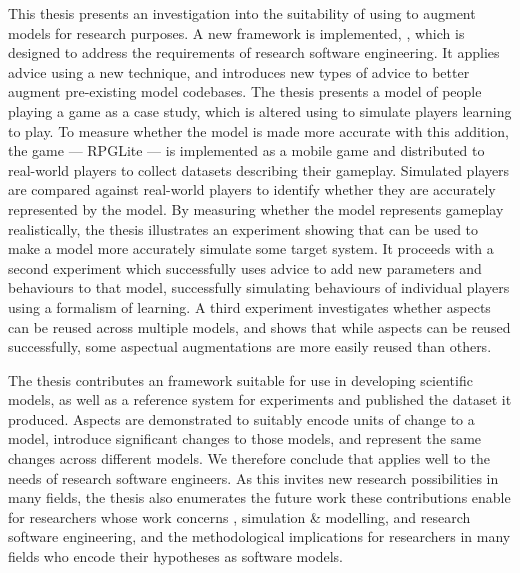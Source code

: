     This thesis presents an investigation into the suitability of using \aop{}
    to augment models for research purposes. A new \aspectorientation{}
    framework is implemented, \pdsf{}, which is designed to address the
    requirements of research software engineering. It applies advice using a new
    technique, and introduces new types of advice to better augment pre-existing
    model codebases. The thesis presents a model of people playing a game as a
    case study, which is altered using \pdsf{} to simulate players learning to
    play. To measure whether the model is made more accurate with this addition,
    the game --- RPGLite --- is implemented as a mobile game and distributed to
    real-world players to collect datasets describing their gameplay. Simulated
    players are compared against real-world players to identify whether they are
    accurately represented by the model. By measuring whether the model
    represents gameplay realistically, the thesis illustrates an experiment
    showing that \aop{} can be used to make a model more accurately simulate
    some target system. It proceeds with a second experiment which successfully
    uses advice to add new parameters and behaviours to that model, successfully
    simulating behaviours of individual players using a formalism of learning. A
    third experiment investigates whether aspects can be reused across multiple
    models, and shows that while aspects can be reused successfully, some
    aspectual augmentations are more easily reused than others. 
    
    The thesis contributes an \aspectorientation{} framework suitable for use in
    developing scientific models, as well as a reference system for experiments
    and published the dataset it produced. Aspects are demonstrated to suitably
    encode units of change to a model, introduce significant changes to those
    models, and represent the same changes across different models. We therefore
    conclude that \aop{} applies well to the needs of research software
    engineers. As this invites new research possibilities in many fields, the
    thesis also enumerates the future work these contributions enable for
    researchers whose work concerns \aop{}, simulation \& modelling, and
    research software engineering, and the methodological implications for
    researchers in many fields who encode their hypotheses as software models. 
    
    


    




